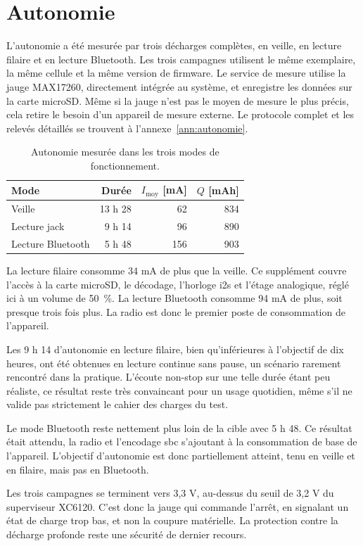 \section{Autonomie}
\label{sec:res_autonomie}

L'autonomie a été mesurée par trois décharges complètes, en veille, en lecture filaire et en lecture Bluetooth. Les trois campagnes utilisent le même exemplaire, la même cellule et la même version de firmware. Le service de mesure utilise la jauge MAX17260, directement intégrée au système, et enregistre les données sur la carte microSD. Même si la jauge n'est pas le moyen de mesure le plus précis, cela retire le besoin d'un appareil de mesure externe. Le protocole complet et les relevés détaillés se trouvent à l'annexe~\ref{ann:autonomie}.

\begin{table}[H]
    \centering
    \renewcommand{\arraystretch}{1.25}
    \caption{Autonomie mesurée dans les trois modes de fonctionnement.}
    \label{tab:res_autonomie}
    \footnotesize
    \begin{tabular}{lrrr}
        \toprule
        Mode              & Durée   & $I_\text{moy}$ [mA] & $Q$ [mAh] \\
        \midrule
        Veille            & 13 h 28 & 62                  & 834       \\
        Lecture jack      & 9 h 14  & 96                  & 890       \\
        Lecture Bluetooth & 5 h 48  & 156                 & 903       \\
        \bottomrule
    \end{tabular}
\end{table}

La lecture filaire consomme 34 mA de plus que la veille. Ce supplément couvre l'accès à la carte microSD, le décodage, l'horloge \gls{i2s} et l'étage analogique, réglé ici à un volume de 50~\%. La lecture Bluetooth consomme 94 mA de plus, soit presque trois fois plus. La radio est donc le premier poste de consommation de l'appareil.

Les 9 h 14 d'autonomie en lecture filaire, bien qu'inférieures à l'objectif de dix heures, ont été obtenues en lecture continue sans pause, un scénario rarement rencontré dans la pratique. L'écoute non-stop sur une telle durée étant peu réaliste, ce résultat reste très convaincant pour un usage quotidien, même s'il ne valide pas strictement le cahier des charges du test.

Le mode Bluetooth reste nettement plus loin de la cible avec 5 h 48. Ce résultat était attendu, la radio et l'encodage \gls{sbc} s'ajoutant à la consommation de base de l'appareil. L'objectif d'autonomie est donc partiellement atteint, tenu en veille et en filaire, mais pas en Bluetooth.

Les trois campagnes se terminent vers 3,3 V, au-dessus du seuil de 3,2 V du superviseur XC6120. C'est donc la jauge qui commande l'arrêt, en signalant un état de charge trop bas, et non la coupure matérielle. La protection contre la décharge profonde reste une sécurité de dernier recours.